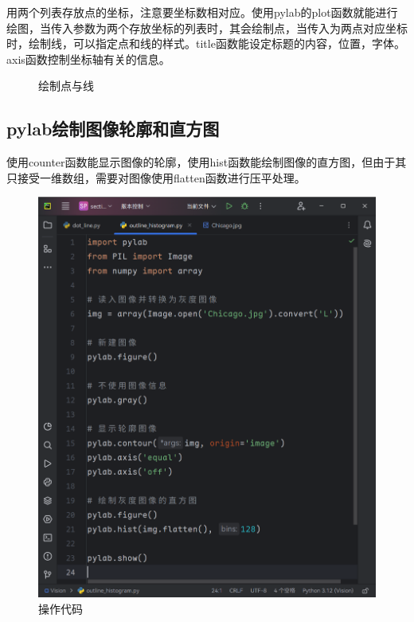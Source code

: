 \documentclass[fontset=ubuntu]{ctexart}
\begin{document}
用两个列表存放点的坐标，注意要坐标数相对应。使用pylab的plot函数就能进行绘图，当传入参数为两个存放坐标的列表时，其会绘制点，当传入为两点对应坐标时，绘制线，可以指定点和线的样式。title函数能设定标题的内容，位置，字体。axis函数控制坐标轴有关的信息。
\begin{figure}[htb]
    \centering
    \caption{绘制点与线}
    \label{dot_line}
\end{figure}

\subsection{pylab绘制图像轮廓和直方图}
使用counter函数能显示图像的轮廓，使用hist函数能绘制图像的直方图，但由于其只接受一维数组，需要对图像使用flatten函数进行压平处理。
\begin{figure}[htb]
    \centering
    \includegraphics[width=0.3\linewidth]{outline_histogram_1.png}
    \caption{操作代码}
    \label{fig:outline_histogram_1}
\end{figure}
\end{document}
